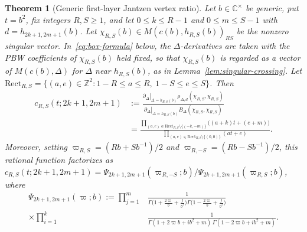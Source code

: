 \documentclass[twoside,10pt]{article}
\numberwithin{equation}{section}
\theoremstyle{slbody}
\newtheorem{theorem}{Theorem}[section]
\theoremstyle{definition}
\theoremstyle{remark}
\begin{document}
\begin{theorem}[Generic first-layer Jantzen vertex ratio]\label{thm:first-layer-ratio}
Let \(b\in\mathbb{C}^\times\) be generic, put \(t=b^2\), fix integers
\(R,S\geq1\), and let \(0\leq k\leq R-1\) and \(0\leq m\leq S-1\) with
\(d=h_{2k+1,2m+1}(b)\).  Let \(\chi_{R,S}(b)\in M(c(b),h_{R,S}(b))_{RS}\) be
the nonzero singular vector.  In~\eqref{eq:box-formula} below, the
\(\Delta\)-derivatives are taken with the PBW coefficients of \(\chi_{R,S}(b)\)
held fixed, so that \(\chi_{R,S}(b)\) is regarded as a vector of
\(M(c(b),\Delta)\) for \(\Delta\) near \(h_{R,S}(b)\), as in
Lemma~\ref{lem:singular-crossing}.  Let
\(\mathrm{Rect}_{R,S}=\{(a,e)\in\mathbb Z^2:1-R\leq a\leq R,\ 1-S\leq e\leq S\}\).
Then
\begin{equation}\label{eq:box-formula}
 \begin{aligned}
 c_{R,S}(t;2k+1,2m+1)
 &:=\frac{\left.\partial_\Delta\right|_{\Delta=h_{R,S}(b)}
         \rho_{\Delta,d}(\chi_{R,S},\chi_{R,S})}
        {\left.\partial_\Delta\right|_{\Delta=h_{R,S}(b)}
         B_\Delta(\chi_{R,S},\chi_{R,S})}\\
 &=\frac{\displaystyle\prod_{(a,e)\in\mathrm{Rect}_{R,S}\setminus\{(-k,-m)\}}
        \bigl((a+k)t+(e+m)\bigr)}
       {\displaystyle\prod_{(a,e)\in\mathrm{Rect}_{R,S}\setminus\{(0,0)\}}
        (at+e)}.
 \end{aligned}
\end{equation}
Moreover, setting \(\varpi_{R,S}=(Rb+Sb^{-1})/2\) and
\(\varpi_{R,-S}=(Rb-Sb^{-1})/2\), this rational function factorizes as
\(c_{R,S}(t;2k+1,2m+1)=\Psi_{2k+1,2m+1}(\varpi_{R,-S};b)/\Psi_{2k+1,2m+1}(\varpi_{R,S};b)\),
where
\begin{equation}\label{eq:gamma-potential}
 \begin{aligned}
  \Psi_{2k+1,2m+1}(\varpi;b)
  :=\prod_{j=1}^m&\frac{1}{\Gamma\bigl(1+\tfrac{2\varpi}{b}+\tfrac{j}{b^2}\bigr)
                           \Gamma\bigl(1-\tfrac{2\varpi}{b}+\tfrac{j}{b^2}\bigr)}\\
   \times\prod_{i=1}^k&\frac{1}{\Gamma(1+2\varpi b+ib^2+m)\,\Gamma(1-2\varpi b+ib^2+m)}.
 \end{aligned}
\end{equation}
\end{theorem}
\end{document}
